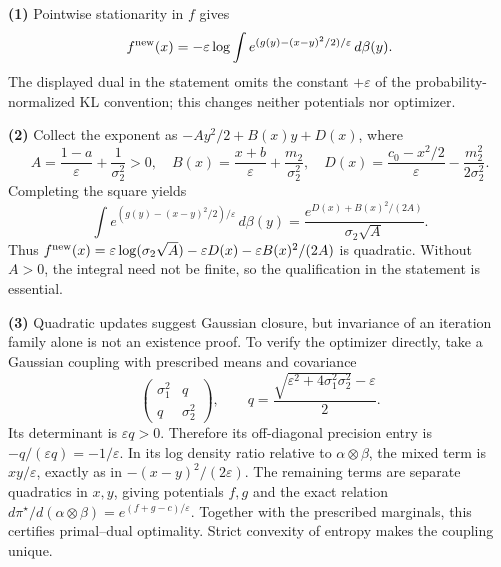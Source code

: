 \documentclass[11pt,a4paper]{article}
\theoremstyle{exostyle}
\begin{document}
\begin{solution}
\textbf{(1)} Pointwise stationarity in $f$ gives
\[
f^{\rm new}(x)=-\varepsilon\log\int e^{(g(y)-(x-y)^2/2)/\varepsilon}\,d\beta(y).
\]
The displayed dual in the statement omits the constant $+\varepsilon$ of the probability-normalized KL convention; this changes neither potentials nor optimizer.

\textbf{(2)} Collect the exponent as $-Ay^2/2+B(x)y+D(x)$, where
\[
A=\frac{1-a}{\varepsilon}+\frac1{\sigma_2^2}>0,\quad
B(x)=\frac{x+b}{\varepsilon}+\frac{m_2}{\sigma_2^2},\quad
D(x)=\frac{c_0-x^2/2}{\varepsilon}-\frac{m_2^2}{2\sigma_2^2}.
\]
Completing the square yields
\[
\int e^{(g(y)-(x-y)^2/2)/\varepsilon}\,d\beta(y)
=\frac{e^{D(x)+B(x)^2/(2A)}}{\sigma_2\sqrt A}.
\]
Thus $f^{\rm new}(x)=\varepsilon\log(\sigma_2\sqrt A)-\varepsilon D(x)-\varepsilon B(x)^2/(2A)$ is quadratic. Without $A>0$, the integral need not be finite, so the qualification in the statement is essential.

\textbf{(3)} Quadratic updates suggest Gaussian closure, but invariance of an iteration family alone is not an existence proof. To verify the optimizer directly, take a Gaussian coupling with prescribed means and covariance
\[
\begin{pmatrix}\sigma_1^2&q\\q&\sigma_2^2\end{pmatrix},\qquad
q=\frac{\sqrt{\varepsilon^2+4\sigma_1^2\sigma_2^2}-\varepsilon}{2}.
\]
Its determinant is $\varepsilon q>0$. Therefore its off-diagonal precision entry is $-q/(\varepsilon q)=-1/\varepsilon$. In its log density ratio relative to $\alpha\otimes\beta$, the mixed term is $xy/\varepsilon$, exactly as in $-(x-y)^2/(2\varepsilon)$. The remaining terms are separate quadratics in $x,y$, giving potentials $f,g$ and the exact relation
$d\pi^\star/d(\alpha\otimes\beta)=e^{(f+g-c)/\varepsilon}$. Together with the prescribed marginals, this certifies primal--dual optimality. Strict convexity of entropy makes the coupling unique.
\end{solution}
\end{document}
